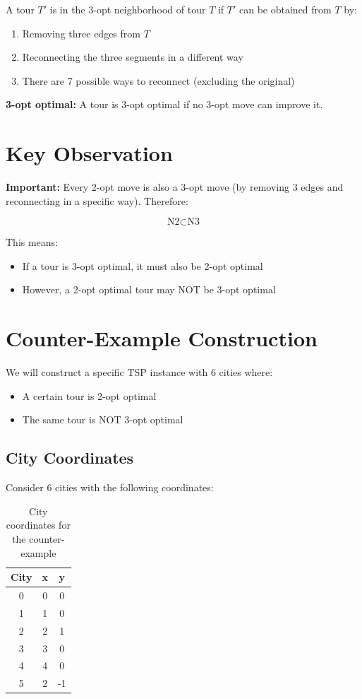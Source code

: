 \documentclass[12pt,a4paper]{article}
\begin{document}
A tour $T'$ is in the 3-opt neighborhood of tour $T$ if $T'$ can be obtained from $T$ by:
\begin{enumerate}
    \item Removing three edges from $T$
    \item Reconnecting the three segments in a different way
    \item There are 7 possible ways to reconnect (excluding the original)
\end{enumerate}

\textbf{3-opt optimal:} A tour is 3-opt optimal if no 3-opt move can improve it.

\section{Key Observation}

\textbf{Important:} Every 2-opt move is also a 3-opt move (by removing 3 edges and reconnecting in a specific way). Therefore:

\[
\text{N2} \subset \text{N3}
\]

This means:
\begin{itemize}
    \item If a tour is 3-opt optimal, it must also be 2-opt optimal
    \item However, a 2-opt optimal tour may NOT be 3-opt optimal
\end{itemize}

\section{Counter-Example Construction}

We will construct a specific TSP instance with 6 cities where:
\begin{itemize}
    \item A certain tour is 2-opt optimal
    \item The same tour is NOT 3-opt optimal
\end{itemize}

\subsection{City Coordinates}

Consider 6 cities with the following coordinates:

\begin{table}[h]
\centering
\begin{tabular}{|c|c|c|}
\hline
\textbf{City} & \textbf{x} & \textbf{y} \\
\hline
0 & 0 & 0 \\
1 & 1 & 0 \\
2 & 2 & 1 \\
3 & 3 & 0 \\
4 & 4 & 0 \\
5 & 2 & -1 \\
\hline
\end{tabular}
\caption{City coordinates for the counter-example}
\end{table}
\end{document}
